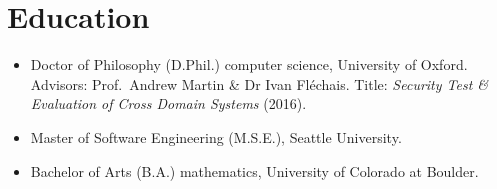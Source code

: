 \section*{Education}
\vspace{-2mm}

\begin{itemize}
    \item Doctor of Philosophy (D.Phil.) computer science, University of Oxford.
        Advisors: Prof.~Andrew Martin \& Dr Ivan Fl\'echais.
        Title: \emph{Security Test \& Evaluation of Cross Domain Systems}
        (2016).\vspace{-1mm}
	\item Master of Software Engineering (M.S.E.), Seattle University.\vspace{-1mm}
	\item Bachelor of Arts (B.A.) mathematics, University of Colorado at Boulder.
\end{itemize}

